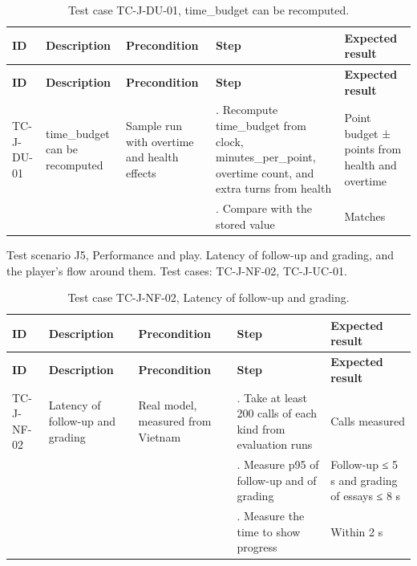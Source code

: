 {\small
\begin{longtable}{|>{\raggedright\arraybackslash}p{}|>{\raggedright\arraybackslash}p{}|>{\raggedright\arraybackslash}p{}|>{\raggedright\arraybackslash}p{}|>{\raggedright\arraybackslash}p{}|}
\caption{Test case TC-J-DU-01, time\_budget can be recomputed.} \\
\hline
\textbf{ID} & \textbf{Description} & \textbf{Precondition} & \textbf{Step} & \textbf{Expected result} \\ \hline
\endfirsthead
\hline
\textbf{ID} & \textbf{Description} & \textbf{Precondition} & \textbf{Step} & \textbf{Expected result} \\ \hline
\endhead
TC-J-DU-01 & time\_budget can be recomputed & Sample run with overtime and health effects & 1. Recompute time\_budget from clock, minutes\_per\_point, overtime count, and extra turns from health & Point budget ± points from health and overtime \\ \hline
 &  &  & 2. Compare with the stored value & Matches \\ \hline
\end{longtable}
}

Test scenario J5, Performance and play. Latency of follow-up and grading, and the player's flow around them. Test cases: TC-J-NF-02, TC-J-UC-01.

{\small
\begin{longtable}{|>{\raggedright\arraybackslash}p{}|>{\raggedright\arraybackslash}p{}|>{\raggedright\arraybackslash}p{}|>{\raggedright\arraybackslash}p{}|>{\raggedright\arraybackslash}p{}|}
\caption{Test case TC-J-NF-02, Latency of follow-up and grading.} \\
\hline
\textbf{ID} & \textbf{Description} & \textbf{Precondition} & \textbf{Step} & \textbf{Expected result} \\ \hline
\endfirsthead
\hline
\textbf{ID} & \textbf{Description} & \textbf{Precondition} & \textbf{Step} & \textbf{Expected result} \\ \hline
\endhead
TC-J-NF-02 & Latency of follow-up and grading & Real model, measured from Vietnam & 1. Take at least 200 calls of each kind from evaluation runs & Calls measured \\ \hline
 &  &  & 2. Measure p95 of follow-up and of grading & Follow-up ≤ 5 s and grading of essays ≤ 8 s \\ \hline
 &  &  & 3. Measure the time to show progress & Within 2 s \\ \hline
\end{longtable}
}

